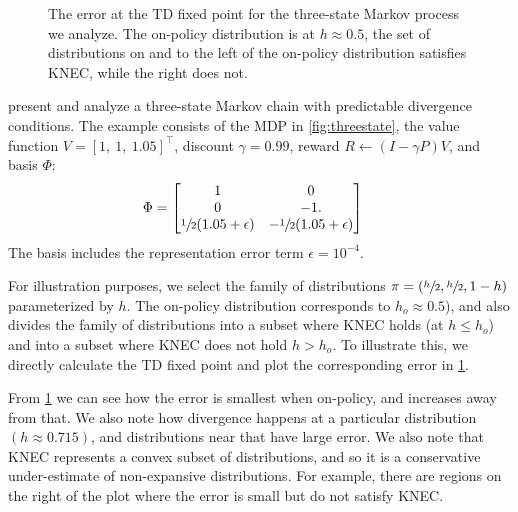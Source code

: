 \begin{figure}[t]
  \centering
  
  \caption{The error at the TD fixed point for the three-state Markov process we analyze. The on-policy distribution is at $h\approx0.5$, the set of distributions on and to the left of the on-policy distribution satisfies KNEC, while the right does not. }
  \label{fig:threestatefixedpoint}
\end{figure}


\citet{manek2022pitfalls} present and analyze a three-state Markov chain with predictable divergence conditions. The example consists of the MDP in \cref{fig:threestate}, the value function $V = [1,~1,~1.05]^\top$, discount $\gamma = 0.99$, reward $R \gets (I-\gamma P)V$, and basis $\Phi$:
\begin{align}
  \Phi & = \begin{bmatrix}
             1                              & 0                               \\
             0                              & -1.                             \\
             \sfrac{1}{2} (1.05 + \epsilon) & -\sfrac{1}{2} (1.05 + \epsilon) \\
           \end{bmatrix}
\end{align}
The basis includes the representation error term $\epsilon = 10^{-4}$.

For illustration purposes, we select the family of distributions $\pi = (\sfrac h 2, \sfrac h 2, 1- h)$ parameterized by $h$. The on-policy distribution corresponds to $h_o\approx 0.5$), and also divides the family of distributions into a subset where KNEC holds (at $h \leq h_o$) and into a subset where KNEC does not hold $h > h_o$. To illustrate this, we directly calculate the TD fixed point and plot the corresponding error in \cref{fig:threestatefixedpoint}.

From \cref{fig:threestatefixedpoint} we can see how the error is smallest when on-policy, and increases away from that. We also note how divergence happens at a particular distribution $(h\approx 0.715)$, and distributions near that have large error. We also note that KNEC represents a convex subset of distributions, and so it is a conservative under-estimate of non-expansive distributions. For example, there are regions on the right of the plot where the error is small but do not satisfy KNEC.
